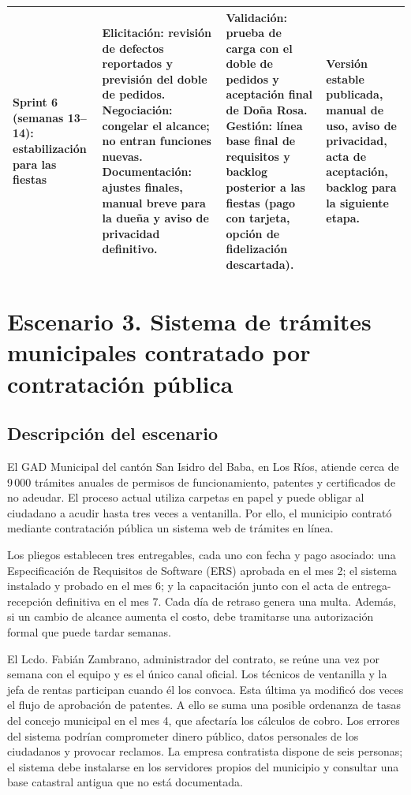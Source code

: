 \documentclass[12pt,a4paper]{article}
\begin{document}
\begin{table}[H]
\begin{tabularx}{\textwidth}{
    >{\raggedright\arraybackslash}p{2.1cm} Y Y Y
}
\midrule
Sprint 6 (semanas 13--14): estabilización para las fiestas & \textbf{Elicitación:} revisión de defectos reportados y previsión del doble de pedidos. \textbf{Negociación:} congelar el alcance; no entran funciones nuevas. \textbf{Documentación:} ajustes finales, manual breve para la dueña y aviso de privacidad definitivo. & \textbf{Validación:} prueba de carga con el doble de pedidos y aceptación final de Doña Rosa. \textbf{Gestión:} línea base final de requisitos y backlog posterior a las fiestas (pago con tarjeta, opción de fidelización descartada). & Versión estable publicada, manual de uso, aviso de privacidad, acta de aceptación, backlog para la siguiente etapa. \\
\bottomrule
\end{tabularx}
\end{table}



\section{Escenario 3. Sistema de trámites municipales contratado por contratación pública}

\subsection{Descripción del escenario}
El GAD Municipal del cantón San Isidro del Baba, en Los Ríos, atiende cerca de 9\,000 trámites anuales de permisos de funcionamiento, patentes y certificados de no adeudar. El proceso actual utiliza carpetas en papel y puede obligar al ciudadano a acudir hasta tres veces a ventanilla. Por ello, el municipio contrató mediante contratación pública un sistema web de trámites en línea.

Los pliegos establecen tres entregables, cada uno con fecha y pago asociado: una Especificación de Requisitos de Software (ERS) aprobada en el mes 2; el sistema instalado y probado en el mes 6; y la capacitación junto con el acta de entrega-recepción definitiva en el mes 7. Cada día de retraso genera una multa. Además, si un cambio de alcance aumenta el costo, debe tramitarse una autorización formal que puede tardar semanas.

El Lcdo. Fabián Zambrano, administrador del contrato, se reúne una vez por semana con el equipo y es el único canal oficial. Los técnicos de ventanilla y la jefa de rentas participan cuando él los convoca. Esta última ya modificó dos veces el flujo de aprobación de patentes. A ello se suma una posible ordenanza de tasas del concejo municipal en el mes 4, que afectaría los cálculos de cobro. Los errores del sistema podrían comprometer dinero público, datos personales de los ciudadanos y provocar reclamos. La empresa contratista dispone de seis personas; el sistema debe instalarse en los servidores propios del municipio y consultar una base catastral antigua que no está documentada.
\end{document}

